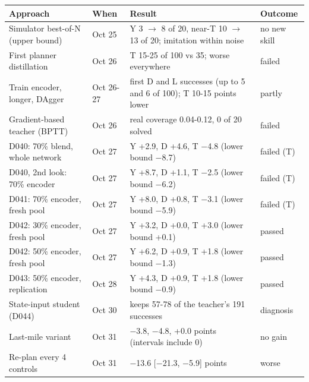 
\begin{tabular}{llp{7.2cm}l}
\toprule
Approach & When & Result & Outcome \\
\midrule
Simulator best-of-N (upper bound) & Oct 25 & Y 3 $\rightarrow$ 8 of 20, near-T 10 $\rightarrow$ 13 of 20; imitation within noise & no new skill \\
First planner distillation & Oct 26 & T 15-25 of 100 vs 35; worse everywhere & failed \\
Train encoder, longer, DAgger & Oct 26-27 & first D and L successes (up to 5 and 6 of 100); T 10-15 points lower & partly \\
Gradient-based teacher (BPTT) & Oct 26 & real coverage 0.04-0.12, 0 of 20 solved & failed \\
D040: 70\% blend, whole network & Oct 27 & Y +2.9, D +4.6, T $-$4.8 (lower bound $-$8.7) & failed (T) \\
D040, 2nd look: 70\% encoder & Oct 27 & Y +8.7, D +1.1, T $-$2.5 (lower bound $-$6.2) & failed (T) \\
D041: 70\% encoder, fresh pool & Oct 27 & Y +8.0, D +0.8, T $-$3.1 (lower bound $-$5.9) & failed (T) \\
D042: 30\% encoder, fresh pool & Oct 27 & Y +3.2, D +0.0, T +3.0 (lower bound +0.1) & passed \\
D042: 50\% encoder, fresh pool & Oct 27 & Y +6.2, D +0.9, T +1.8 (lower bound $-$1.3) & passed \\
D043: 50\% encoder, replication & Oct 28 & Y +4.3, D +0.9, T +1.8 (lower bound $-$0.9) & passed \\
State-input student (D044) & Oct 30 & keeps 57-78 of the teacher's 191 successes & diagnosis \\
Last-mile variant & Oct 31 & $-$3.8, $-$4.8, +0.0 points (intervals include 0) & no gain \\
Re-plan every 4 controls & Oct 31 & $-$13.6 [$-$21.3, $-$5.9] points & worse \\
\bottomrule
\end{tabular}
